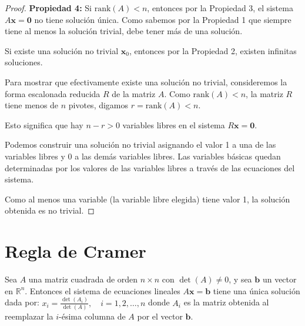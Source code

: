 \begin{proof}
\textbf{Propiedad 4:} Si $\text{rank}(A) < n$, entonces por la Propiedad 3, el sistema $A\mathbf{x} = \mathbf{0}$ no tiene solución única. Como sabemos por la Propiedad 1 que siempre tiene al menos la solución trivial, debe tener más de una solución.

Si existe una solución no trivial $\mathbf{x}_0$, entonces por la Propiedad 2, existen infinitas soluciones.

Para mostrar que efectivamente existe una solución no trivial, consideremos la forma escalonada reducida $R$ de la matriz $A$. Como $\text{rank}(A) < n$, la matriz $R$ tiene menos de $n$ pivotes, digamos $r = \text{rank}(A) < n$.

Esto significa que hay $n - r > 0$ variables libres en el sistema $R\mathbf{x} = \mathbf{0}$.

Podemos construir una solución no trivial asignando el valor 1 a una de las variables libres y 0 a las demás variables libres. Las variables básicas quedan determinadas por los valores de las variables libres a través de las ecuaciones del sistema.

Como al menos una variable (la variable libre elegida) tiene valor 1, la solución obtenida es no trivial.
\end{proof}

\section{Regla de Cramer}

\begin{theorem}
Sea $A$ una matriz cuadrada de orden $n \times n$ con $\det(A) \neq 0$, y sea $\mathbf{b}$ un vector en $\mathbb{R}^n$. Entonces el sistema de ecuaciones lineales $A\mathbf{x} = \mathbf{b}$ tiene una única solución dada por:
$x_i = \frac{\det(A_i)}{\det(A)}, \quad i = 1, 2, \ldots, n$
donde $A_i$ es la matriz obtenida al reemplazar la $i$-ésima columna de $A$ por el vector $\mathbf{b}$.
\end{theorem}


